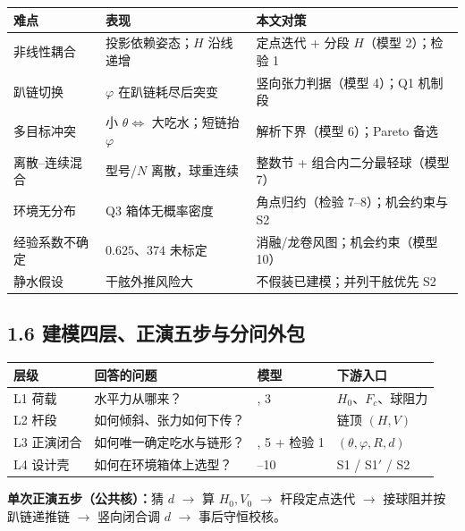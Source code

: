 \documentclass[UTF8,a4paper,zihao=-4]{ctexart}
\begin{document}
\begin{center}\footnotesize
\begin{tabularx}{\textwidth}{|>{\raggedright\arraybackslash}p{2.0cm}|>{\raggedright\arraybackslash}X|>{\raggedright\arraybackslash}X|}
\hline
难点 & 表现 & 本文对策 \\
\hline
非线性耦合 & 投影依赖姿态；$H$ 沿线递增 & 定点迭代 + 分段 $H$（模型 2）；检验 1 \\
\hline
趴链切换 & $\varphi$ 在趴链耗尽后突变 & 竖向张力判据（模型 4）；Q1 机制段 \\
\hline
多目标冲突 & 小 $\theta\Leftrightarrow$ 大吃水；短链抬 $\varphi$ & 解析下界（模型 6）；Pareto 备选 \\
\hline
离散--连续混合 & 型号/$N$ 离散，球重连续 & 整数节 + 组合内二分最轻球（模型 7） \\
\hline
环境无分布 & Q3 箱体无概率密度 & 角点归约（检验 7--8）；机会约束与 S2 \\
\hline
经验系数不确定 & $0.625$、$374$ 未标定 & 消融/龙卷风图；机会约束（模型 10） \\
\hline
静水假设 & 干舷外推风险大 & 不假装已建模；并列干舷优先 S2 \\
\hline
\end{tabularx}
\end{center}

\subsection{\texorpdfstring{1.6 建模四层、正演五步与分问外包}{1.6 建模流程}}

\begin{center}\footnotesize
\begin{tabularx}{\textwidth}{|>{\centering\arraybackslash}p{1.6cm}|>{\raggedright\arraybackslash}X|>{\raggedright\arraybackslash}p{1.8cm}|>{\raggedright\arraybackslash}X|}
\hline
层级 & 回答的问题 & 模型 & 下游入口 \\
\hline
L1 荷载 & 水平力从哪来？ & 1, 3 & $H_0$、$F_c$、球阻力 \\
\hline
L2 杆段 & 如何倾斜、张力如何下传？ & 2 & 链顶 $(H,V)$ \\
\hline
L3 正演闭合 & 如何唯一确定吃水与链形？ & 4, 5 + 检验 1 & $(\theta,\varphi,R,d)$ \\
\hline
L4 设计壳 & 如何在环境箱体上选型？ & 6--10 & S1 / S1$'$ / S2 \\
\hline
\end{tabularx}
\end{center}
\vspace{0.25em}
\textbf{单次正演五步（公共核）：}猜 $d$ $\to$ 算 $H_0,V_0$ $\to$ 杆段定点迭代 $\to$ 接球阻并按趴链递推链 $\to$ 竖向闭合调 $d$ $\to$ 事后守恒校核。
\end{document}
